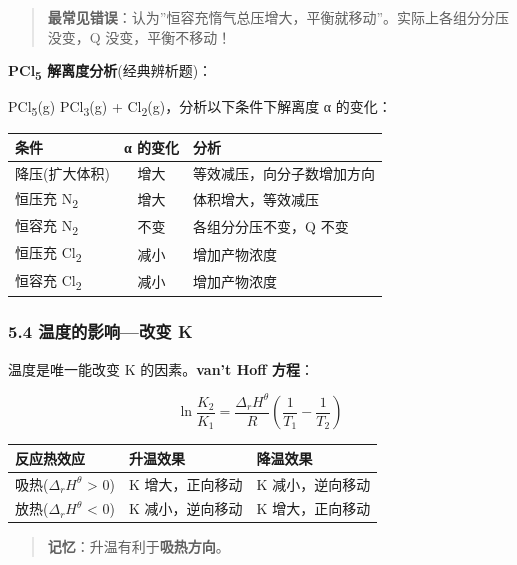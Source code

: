 \begin{quote}
\textbf{最常见错误}：认为''恒容充惰气总压增大，平衡就移动''。实际上各组分分压没变，Q 没变，平衡不移动！
\end{quote}

\textbf{PCl\textsubscript{5} 解离度分析}(经典辨析题)：

PCl\textsubscript{5}(g) \衡 PCl\textsubscript{3}(g) + Cl\textsubscript{2}(g)，分析以下条件下解离度 α 的变化：

{\def\LTcaptype{none} %
\begin{longtable}[]{@{}lcl@{}}
\toprule\noalign{}
条件 & α 的变化 & 分析 \\
\midrule\noalign{}
\endhead
\bottomrule\noalign{}
\endlastfoot
降压(扩大体积) & 增大 & 等效减压，向分子数增加方向 \\
恒压充 N\textsubscript{2} & 增大 & 体积增大，等效减压 \\
恒容充 N\textsubscript{2} & 不变 & 各组分分压不变，Q 不变 \\
恒压充 Cl\textsubscript{2} & 减小 & 增加产物浓度 \\
恒容充 Cl\textsubscript{2} & 减小 & 增加产物浓度 \\
\end{longtable}
}

\subsubsection{5.4 温度的影响---改变 K}\label{ux6e29ux5ea6ux7684ux5f71ux54cdux6539ux53d8-k}

温度是唯一能改变 K 的因素。\textbf{van't Hoff 方程}：

\[
\boxed{\ln\frac{K_2}{K_1} = \frac{\Delta_r H^\theta}{R}\left(\frac{1}{T_1} - \frac{1}{T_2}\right)}
\]

{\def\LTcaptype{none} %
\begin{longtable}[]{@{}lll@{}}
\toprule\noalign{}
反应热效应 & 升温效果 & 降温效果 \\
\midrule\noalign{}
\endhead
\bottomrule\noalign{}
\endlastfoot
吸热(\(\Delta_r H^\theta\) \textgreater{} 0) & K 增大，正向移动 & K 减小，逆向移动 \\
放热(\(\Delta_r H^\theta\) \textless{} 0) & K 减小，逆向移动 & K 增大，正向移动 \\
\end{longtable}
}

\begin{quote}
\textbf{记忆}：升温有利于\textbf{吸热方向}。
\end{quote}

